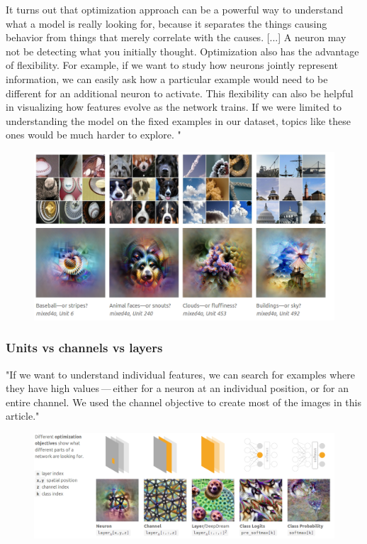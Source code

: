 \documentclass[]{scrartcl}
\begin{document}
It turns out that optimization approach can be a powerful way to understand what a model is really looking for, because it separates the things causing behavior from things that merely correlate with the causes. [...] A neuron may not be detecting what you initially thought. Optimization also has the advantage of ﬂexibility. For example, if we want to study how neurons jointly represent information, we can easily ask how a particular example would need to be different for an additional neuron to activate. This ﬂexibility can also be helpful in visualizing how features evolve as the network trains. If we were limited to understanding the model on the ﬁxed examples in our dataset, topics like these ones would be much harder to explore. " \cite{Olah2017}
\begin{figure}[h]
	\centering
	\includegraphics[width=1\linewidth]{optimization}
\end{figure}

\subsubsection{Units vs channels vs layers}
"If we want to understand individual features, we can search for examples where they have high values --- either for a neuron at an individual position, or for an entire channel. We used the channel objective to create most of the images in this article." \cite{Olah2017}
\begin{figure}[h]
	\centering
	\includegraphics[width=1\linewidth]{diffopt}
\end{figure}
\end{document}
